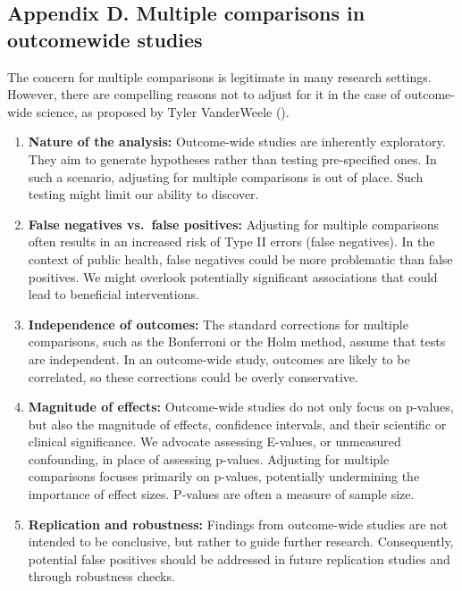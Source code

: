 \documentclass[
  singlecolumn,
  9pt]{article}
\begin{document}
\newpage{}

\subsection{Appendix D. Multiple comparisons in outcomewide
studies}\label{appendix-d.-multiple-comparisons-in-outcomewide-studies}

The concern for multiple comparisons is legitimate in many research
settings. However, there are compelling reasons not to adjust for it in
the case of outcome-wide science, as proposed by Tyler VanderWeele
().

\begin{enumerate}
\def\labelenumi{\arabic{enumi}.}
\item
  \textbf{Nature of the analysis:} Outcome-wide studies are inherently
  exploratory. They aim to generate hypotheses rather than testing
  pre-specified ones. In such a scenario, adjusting for multiple
  comparisons is out of place. Such testing might limit our ability to
  discover.
\item
  \textbf{False negatives vs.~false positives:} Adjusting for multiple
  comparisons often results in an increased risk of Type II errors
  (false negatives). In the context of public health, false negatives
  could be more problematic than false positives. We might overlook
  potentially significant associations that could lead to beneficial
  interventions.
\item
  \textbf{Independence of outcomes:} The standard corrections for
  multiple comparisons, such as the Bonferroni or the Holm method,
  assume that tests are independent. In an outcome-wide study, outcomes
  are likely to be correlated, so these corrections could be overly
  conservative.
\item
  \textbf{Magnitude of effects:} Outcome-wide studies do not only focus
  on p-values, but also the magnitude of effects, confidence intervals,
  and their scientific or clinical significance. We advocate assessing
  E-values, or unmeasured confounding, in place of assessing p-values.
  Adjusting for multiple comparisons focuses primarily on p-values,
  potentially undermining the importance of effect sizes. P-values are
  often a measure of sample size.
\item
  \textbf{Replication and robustness:} Findings from outcome-wide
  studies are not intended to be conclusive, but rather to guide further
  research. Consequently, potential false positives should be addressed
  in future replication studies and through robustness checks.
\end{enumerate}
\end{document}
